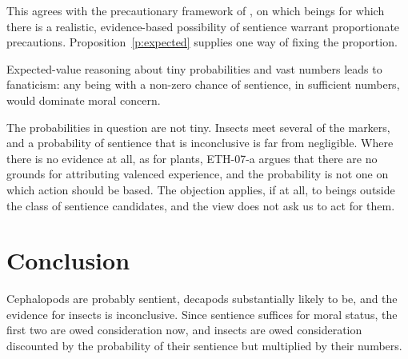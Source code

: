 \documentclass{situationist-preprint}
\begin{document}
This agrees with the precautionary framework of \citet{Birch2024}, on which beings for which there is a realistic, evidence-based possibility of sentience warrant proportionate precautions. Proposition~\ref{p:expected} supplies one way of fixing the proportion.

\begin{objection}
Expected-value reasoning about tiny probabilities and vast numbers leads to fanaticism: any being with a non-zero chance of sentience, in sufficient numbers, would dominate moral concern.
\end{objection}

\begin{reply}
The probabilities in question are not tiny. Insects meet several of the markers, and a probability of sentience that is inconclusive is far from negligible. Where there is no evidence at all, as for plants, ETH-07-a argues that there are no grounds for attributing valenced experience, and the probability is not one on which action should be based. The objection applies, if at all, to beings outside the class of sentience candidates, and the view does not ask us to act for them.
\end{reply}

\section{Conclusion}

Cephalopods are probably sentient, decapods substantially likely to be, and the evidence for insects is inconclusive. Since sentience suffices for moral status, the first two are owed consideration now, and insects are owed consideration discounted by the probability of their sentience but multiplied by their numbers.
\end{document}
